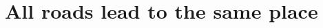 \documentclass[xcolor=dvipsnames]{beamer}
\begin{document}




\section{All roads lead to the same place}
\end{document}

